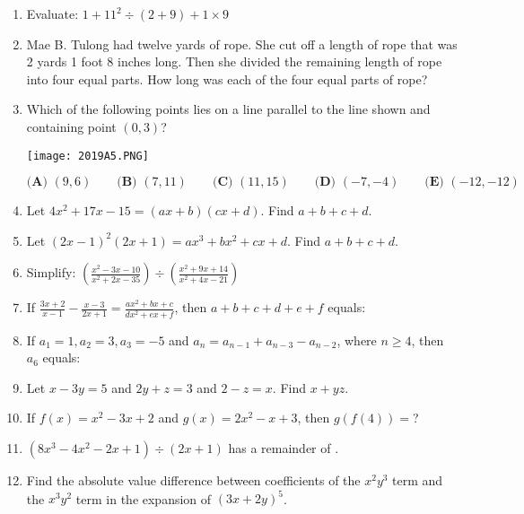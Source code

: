 \documentclass[../uilmath.tex]{subfiles}
\begin{document}
\begin{enumerate}[label=\bfseries\arabic*.]
        \item %
        Evaluate: $1+11^2\div (2+9)+1\times 9$

        \item %
        Mae B. Tulong had twelve yards of rope. She cut off a length of rope that was 2 yards 1 foot 8 inches long.
        Then she divided the remaining length of rope into four equal parts. How long was each of the four equal parts of rope?

        \item %
        Which of the following points lies on a line parallel to the line shown and containing point $(0,3)$?
        \begin{center}
            \texttt{[image: 2019A5.PNG]}
        \end{center}

        $\textbf{(A) } (9,6) \qquad \textbf{(B) } (7,11) \qquad \textbf{(C) } (11,15)\qquad \textbf{(D) }(-7,-4) \qquad \textbf{(E) } (-12,-12)$

        \item %
        Let $4x^2+17x-15=(ax+b)(cx+d)$. Find $a+b+c+d$.

        \item %
        Let $(2x-1)^2(2x+1)=ax^3+bx^2+cx+d$. Find $a+b+c+d$.

        \item %
        Simplify: $\left(\frac{x^2-3x-10}{x^2+2x-35}\right)\div \left(\frac{x^2+9x+14}{x^2+4x-21}\right)$

        \item %
        If $\frac{3x+2}{x-1}-\frac{x-3}{2x+1}=\frac{ax^2+bx+c}{dx^2+ex+f}$, then $a+b+c+d+e+f$ equals:

        \item %
        If $a_1=1, a_2=3, a_3=-5$ and $a_n=a_{n-1}+a_{n-3}-a_{n-2}$, where $n\geq 4$, then $a_6$ equals:

        \item %
        Let $x-3y=5$ and $2y+z=3$ and $2-z=x$. Find $x+yz$.

        \item %
        If $f(x)=x^2-3x+2$ and $g(x)=2x^2-x+3$, then $g(f(4))=$?

        \item %
        $(8x^3-4x^2-2x+1)\div (2x+1)$ has a remainder of \blank .

        \item %
        Find the absolute value difference between coefficients of the $x^2y^3$ term and the $x^3y^2$ term in the expansion of $(3x+2y)^5$.


\end{enumerate}
\end{document}
